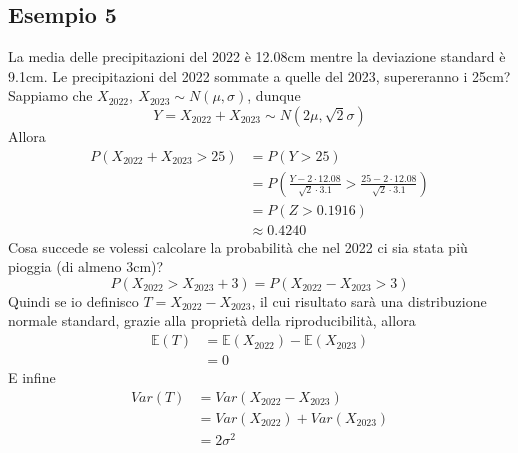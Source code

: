 \documentclass[11pt]{report}
\begin{document}
\subsection{Esempio 5}
La media delle precipitazioni del 2022 è 12.08cm mentre la deviazione standard è 9.1cm. Le precipitazioni del 2022 sommate a quelle del 2023, supereranno i 25cm?\\
Sappiamo che $X_{2022},\ X_{2023} \sim N(\mu, \sigma)$, dunque
\begin{equation}
	Y = X_{2022} + X_{2023} \sim N \left( 2\mu, \sqrt{2}\sigma \right)
\end{equation}
Allora
\begin{equation}
    \begin{split}
       P(X_{2022} + X_{2023} > 25) & = P(Y > 25)\\
       & = P \left( \frac{Y - 2 \cdot 12.08}{\sqrt{2} \cdot 3.1} > \frac{25 - 2 \cdot 12.08}{\sqrt{2} \cdot 3.1} \right)\\
       & = P(Z > 0.1916)\\
       & \approx 0.4240
    \end{split}
\end{equation}
Cosa succede se volessi calcolare la probabilità che nel 2022 ci sia stata più pioggia (di almeno 3cm)?
$$P(X_{2022} > X_{2023} + 3) = P(X_{2022} - X_{2023} > 3)$$
Quindi se io definisco $T = X_{2022} - X_{2023}$, il cui risultato sarà una distribuzione normale standard, grazie alla proprietà della riproducibilità, allora
\begin{equation}
	\begin{split}
		\mathbb{E}(T) & = \mathbb{E}(X_{2022}) - \mathbb{E}(X_{2023})\\
		& = 0
    \end{split}
\end{equation}
E infine
\begin{equation}
	\begin{split}
		Var(T) & = Var(X_{2022} - X_{2023})\\
		& = Var(X_{2022}) + Var(X_{2023})\\
		& = 2\sigma^2
    \end{split}
\end{equation}
\end{document}
